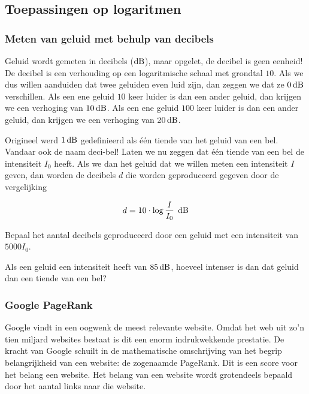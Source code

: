 \documentclass[12pt,twoside,a4paper]{article}
\begin{document}
\subsection{Toepassingen op logaritmen}

\subsubsection{Meten van geluid met behulp van decibels}

Geluid wordt gemeten in decibels ($\dB$), maar opgelet, de decibel is geen eenheid! De decibel is een verhouding op een logaritmische schaal met grondtal $10$. Als we dus willen aanduiden dat twee geluiden even luid zijn, dan zeggen we dat ze $0\dB$ verschillen. Als een ene geluid $10$ keer luider is dan een ander geluid, dan krijgen we een verhoging van $10\dB$. Als een ene geluid $100$ keer luider is dan een ander geluid, dan krijgen we een verhoging van $20\dB$.

Origineel werd $1\dB$ gedefinieerd als één tiende van het geluid van een bel. Vandaar ook de naam deci-bel! Laten we nu zeggen dat één tiende van een bel de intensiteit $I_0$ heeft. Als we dan het geluid dat we willen meten een intensiteit $I$ geven, dan worden de decibels $d$ die worden geproduceerd gegeven door de vergelijking

$$d=10\cdot \log\dfrac{I}{I_0} \;\dB$$

\begin{oefening}
Bepaal het aantal decibels geproduceerd door een geluid met een intensiteit van $5000I_0$.
\end{oefening}

\begin{oefening}
Als een geluid een intensiteit heeft van $85\dB$, hoeveel intenser is dan dat geluid dan een tiende van een bel?
\end{oefening}

\subsubsection{Google PageRank}

Google vindt in een oogwenk de meest relevante website. Omdat het web uit zo’n tien miljard websites bestaat is dit een enorm indrukwekkende prestatie. De kracht van Google schuilt in de mathematische omschrijving van het begrip belangrijkheid van een website: de zogenaamde PageRank. Dit is een score voor het belang een website. Het belang van een website wordt grotendeels bepaald door het aantal links naar die website.\\
\end{document}
